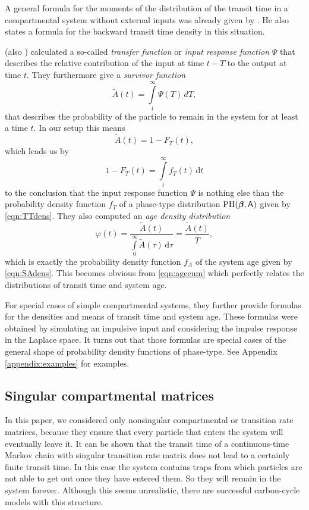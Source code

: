 \documentclass[smallextended]{svjour3}
\newcommand{\intl}{\int\limits}
\begin{document}
A general formula for the moments of the distribution of the transit time in a compartmental system without external inputs was already given by \citet{Hearon1972MBS}.
He also states a formula for the backward transit time density in this situation.

\citet{Manzoni2009JGR} (also \citet{Thompson1999GCB, Priestley1982}) calculated a so-called \emph{transfer function} or \emph{input response function} $\Psi$ that describes the relative contribution of the input at time $t-T$ to the output at time $t$.
They furthermore give a \emph{survivor function}
\[
    \tilde{A}(t) = \intl_t^\infty \Psi(T)\,dT,
\]
that describes the probability of the particle to remain in the system for at least a time $t$. In our setup this means
\[
    \tilde{A}(t) = 1-F_T(t),
\]
which leads us by
\[
    1-F_T(t) = \intl_t^\infty f_T(t)\,\mathrm{d}t
\]
to the conclusion that the input response function $\Psi$ is nothing else than the probability density function $f_T$ of a phase-type distribution $\operatorname{PH}(\vec{\beta},\tens{A})$ given by \eqref{eqn:TTdens}.
They also computed an \emph{age density distribution}
\[
    \varphi(t) = \frac{\tilde{A}(t)}{\intl_0^\infty \tilde{A}(\tau)\,\mathrm{d}\tau} = \frac{\tilde{A}(t)}{\overline{T}},
\]
which is exactly the probability density function $f_A$ of the system age given by \eqref{eqn:SAdens}.
This becomes obvious from \eqref{eqn:agecum} which perfectly relates the distributions of transit time and system age.

For special cases of simple compartmental systems, they further provide formulas for the densities and means of transit time and system age.
These formulas were obtained by simulating an impulsive input and considering the impulse response in the Laplace space.
It turns out that those formulas are special cases of the general shape of probability density functions of phase-type.
See Appendix \ref{appendix:examples} for examples.

\subsection{Singular compartmental matrices}

In this paper, we considered only nonsingular compartmental or transition rate matrices, because they ensure that every particle that enters the system will eventually leave it.
It can be shown \citep{Neuts1981} that the transit time of a continuous-time Markov chain with singular transition rate matrix does not lead to a certainly finite transit time.
In this case the system contains traps from which particles are not able to get out once they have entered them.
So they will remain in the system forever.
Although this seems unrealistic, there are successful carbon-cycle models with this structure.
\end{document}
